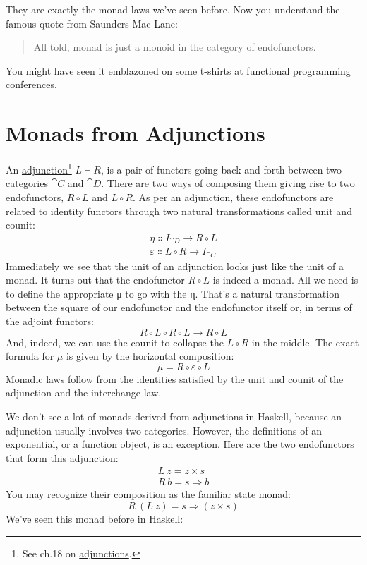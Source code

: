 \noindent
They are exactly the monad laws we've seen before. Now you understand
the famous quote from Saunders Mac Lane:

\begin{quote}
All told, monad is just a monoid in the category of endofunctors.
\end{quote}
You might have seen it emblazoned on some t-shirts at functional
programming conferences.

\section{Monads from Adjunctions}

An \hyperref[adjunctions]{adjunction}\footnote{See ch.18 on \hyperref[adjunctions]{adjunctions}.}
$L \dashv R$, is a pair of functors going back and forth between two
categories $\cat{C}$ and $\cat{D}$. There are two ways of composing them
giving rise to two endofunctors, $R \circ L$ and $L \circ R$.
As per an adjunction, these endofunctors are related to identity
functors through two natural transformations called unit and counit:
\begin{gather*}
\eta \Colon I_{\cat{D}} \to R \circ L \\
\varepsilon \Colon L \circ R \to I_{\cat{C}}
\end{gather*}
Immediately we see that the unit of an adjunction looks just like the
unit of a monad. It turns out that the endofunctor $R \circ L$ is
indeed a monad. All we need is to define the appropriate μ to go with
the η. That's a natural transformation between the square of our
endofunctor and the endofunctor itself or, in terms of the adjoint
functors:
\[R \circ L \circ R \circ L \to R \circ L\]
And, indeed, we can use the counit to collapse the $L \circ R$ in
the middle. The exact formula for $\mu$ is given by the horizontal
composition:
\[\mu = R \circ \varepsilon \circ L\]
Monadic laws follow from the identities satisfied by the unit and counit
of the adjunction and the interchange law.

We don't see a lot of monads derived from adjunctions in Haskell,
because an adjunction usually involves two categories. However, the
definitions of an exponential, or a function object, is an exception.
Here are the two endofunctors that form this adjunction:
\begin{gather*}
L\ z = z\times{}s \\
R\ b = s \Rightarrow b
\end{gather*}
You may recognize their composition as the familiar state monad:
\[R\ (L\ z) = s \Rightarrow (z\times{}s)\]
We've seen this monad before in Haskell:

